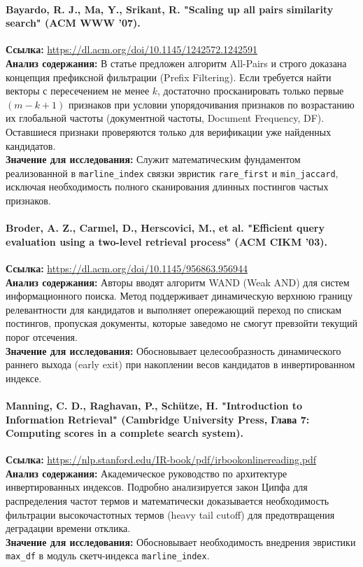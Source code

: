 \documentclass[a4paper,14pt]{extarticle}
\begin{document}
\paragraph{Bayardo, R. J., Ma, Y., Srikant, R. "Scaling up all pairs similarity search" (ACM WWW '07).}
\textbf{Ссылка:} \url{https://dl.acm.org/doi/10.1145/1242572.1242591} \\
\textbf{Анализ содержания:} В статье предложен алгоритм All-Pairs и строго доказана концепция префиксной фильтрации (Prefix Filtering). Если требуется найти векторы с пересечением не менее $k$, достаточно просканировать только первые $(m - k + 1)$ признаков при условии упорядочивания признаков по возрастанию их глобальной частоты (документной частоты, Document Frequency, DF). Оставшиеся признаки проверяются только для верификации уже найденных кандидатов. \\
\textbf{Значение для исследования:} Служит математическим фундаментом реализованной в \texttt{marline\_index} связки эвристик \texttt{rare\_first} и \texttt{min\_jaccard}, исключая необходимость полного сканирования длинных постингов частых признаков.

\paragraph{Broder, A. Z., Carmel, D., Herscovici, M., et al. "Efficient query evaluation using a two-level retrieval process" (ACM CIKM '03).}
\textbf{Ссылка:} \url{https://dl.acm.org/doi/10.1145/956863.956944} \\
\textbf{Анализ содержания:} Авторы вводят алгоритм WAND (Weak AND) для систем информационного поиска. Метод поддерживает динамическую верхнюю границу релевантности для кандидатов и выполняет опережающий переход по спискам постингов, пропуская документы, которые заведомо не смогут превзойти текущий порог отсечения. \\
\textbf{Значение для исследования:} Обосновывает целесообразность динамического раннего выхода (early exit) при накоплении весов кандидатов в инвертированном индексе.

\paragraph{Manning, C. D., Raghavan, P., Schütze, H. "Introduction to Information Retrieval" (Cambridge University Press, Глава 7: Computing scores in a complete search system).}
\textbf{Ссылка:} \url{https://nlp.stanford.edu/IR-book/pdf/irbookonlinereading.pdf} \\
\textbf{Анализ содержания:} Академическое руководство по архитектуре инвертированных индексов. Подробно анализируется закон Ципфа для распределения частот термов и математически доказывается необходимость фильтрации высокочастотных термов (heavy tail cutoff) для предотвращения деградации времени отклика. \\
\textbf{Значение для исследования:} Обосновывает необходимость внедрения эвристики \texttt{max\_df} в модуль скетч-индекса \texttt{marline\_index}.
\end{document}
